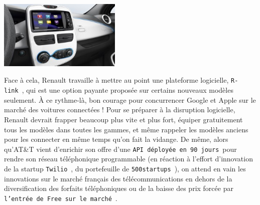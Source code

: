 \documentclass[11pt,twoside,a4paper]{article}
\begin{document}
\begin{minipage}[h]{6.00cm}
	\includegraphics[width=5.85cm]{img/tablette-r-link-renault-zoe-300x168.jpg}
\end{minipage} \hfill \begin{minipage}[h]{12.00cm}
	Face {\`a} cela, Renault travaille {\`a} mettre au point une plateforme logicielle, \texttt{R-link}~\footnotemark, qui est une option payante propos{\'e}e sur certains nouveaux mod{\`e}les seulement. {\`A} ce rythme-l{\`a}, bon courage pour concurrencer Google et Apple sur le march{\'e} des voitures connect{\'e}es ! Pour se pr{\'e}parer {\`a} la disruption logicielle, Renault devrait frapper beaucoup plus vite et plus fort, {\'e}quiper gratuitement tous les mod{\`e}les dans toutes les gammes, et m{\^e}me rappeler les mod{\`e}les anciens pour les connecter en m{\^e}me temps qu'on fait la vidange. De m{\^e}me, alors qu'AT\&T vient d'enrichir son offre d'une \texttt{API d{\'e}ploy{\'e}e en 90 jours}~\footnotemark pour rendre son r{\'e}seau t{\'e}l{\'e}phonique programmable (en r{\'e}action {\`a} l'effort d'innovation de la startup \texttt{Twilio}~\footnotemark, du portefeuille de \texttt{500startups}~\footnotemark), on attend en vain les innovations sur le march{\'e} fran\c{c}ais des t{\'e}l{\'e}communications en dehors de la diversification des forfaits t{\'e}l{\'e}phoniques ou de la baisse des prix forc{\'e}e par \texttt{l'entr{\'e}e de Free sur le march{\'e}}~\footnotemark.
\end{minipage} ~\\~\\
\end{document}
